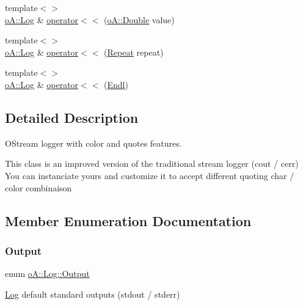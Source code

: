 \begin{DoxyCompactItemize}
\item 
{\footnotesize template$<$$>$ }\\\mbox{\hyperlink{classo_a_1_1_log}{o\+A\+::\+Log}} \& \mbox{\hyperlink{classo_a_1_1_log_a59165364886174ee41ef0addd123b216}{operator$<$$<$}} (\mbox{\hyperlink{namespaceo_a_a2bcc976232176d2dcf8b9df1fa33c038}{o\+A\+::\+Double}} value)
\item 
{\footnotesize template$<$$>$ }\\\mbox{\hyperlink{classo_a_1_1_log}{o\+A\+::\+Log}} \& \mbox{\hyperlink{classo_a_1_1_log_af5330fde11ac127dba6a6091e5e12b69}{operator$<$$<$}} (\mbox{\hyperlink{classo_a_1_1_repeat}{Repeat}} repeat)
\item 
{\footnotesize template$<$$>$ }\\\mbox{\hyperlink{classo_a_1_1_log}{o\+A\+::\+Log}} \& \mbox{\hyperlink{classo_a_1_1_log_ace93b1b2eda01f9b9a0c81bc8b23083d}{operator$<$$<$}} (\mbox{\hyperlink{classo_a_1_1_endl}{Endl}})
\end{DoxyCompactItemize}


\subsection{Detailed Description}
O\+Stream logger with color and quotes features. 

This class is an improved version of the traditional stream logger (cout / cerr) You can instanciate yours and customize it to accept different quoting char / color combinaison 

\subsection{Member Enumeration Documentation}
\mbox{\label{classo_a_1_1_log_a640171dc239ea7befcd640362343f88f}} 
\subsubsection{\texorpdfstring{Output}{Output}}
{\footnotesize\ttfamily enum \mbox{\hyperlink{classo_a_1_1_log_a640171dc239ea7befcd640362343f88f}{o\+A\+::\+Log\+::\+Output}}}



\mbox{\hyperlink{classo_a_1_1_log}{Log}} default standard outputs (stdout / stderr) 

